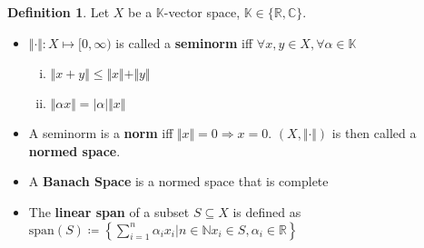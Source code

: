 \documentclass[10pt,a4paper]{article}
\theoremstyle{definition}
\newtheorem{definition}{Definition}
\theoremstyle{cor}
\theoremstyle{theorem}
\theoremstyle{lemma}
\theoremstyle{example}
\newcommand{\norm}[1]{\Vert #1 \Vert}
\begin{document}
\begin{definition}
Let $X$ be a $\mathbb{K}$-vector space, $\mathbb{K}\in\{\mathbb{R}, \mathbb{C}\}$.
\begin{itemize}
\item $\Vert\cdot\Vert : X \mapsto [0, \infty)$ is called a \textbf{seminorm} iff $\forall x, y \in X, \forall \alpha\in\mathbb{K}$
\begin{enumerate}[(i)]
\item $\Vert x + y \Vert \leq \Vert x \Vert + \Vert y \Vert$
\item $\Vert\alpha x \Vert = |\alpha| \Vert x \Vert$
\end{enumerate}
\item A seminorm is a \textbf{norm} iff $\norm{x} = 0 \Rightarrow x = 0$. $(X, \norm{\cdot})$ is then called a \textbf{normed space}.
\item A \textbf{Banach Space} is a normed space that is complete
\item The \textbf{linear span} of a subset $S \subseteq X$ is defined as $\text{span}(S) \coloneqq \left\{ \sum_{i = 1}^{n} \alpha_i x_i | n\in \mathbb{N} x_i \in S, \alpha_i \in \mathbb{R}\right\}$
\end{itemize}
\end{definition}
\end{document}

